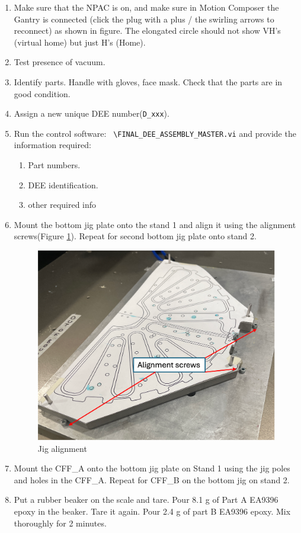 \documentclass[12pt]{cornelltfpxsop}
\begin{document}
\begin{paracol}{2}
\begin{enumerate}
\item Make sure that the NPAC is on, and make sure in Motion Composer the Gantry is connected (click the plug with a plus / the swirling arrows to reconnect) as shown in figure. The elongated circle should not show VH's (virtual home) but just H's (Home).
    \item Test presence of vacuum.        
    \item Identify parts. Handle with gloves, face mask. Check that the parts are in good condition.
    \item Assign a new unique DEE number(\texttt{D\_xxx}).
    \item Run the control software: \verb| \FINAL_DEE_ASSEMBLY_MASTER.vi| and provide the information required:
    \begin{enumerate}
        \item Part numbers.
        \item DEE identification.
        \item other required info
    \end{enumerate}
    \item Mount the bottom jig plate onto the stand 1 and align it using the alignment screws(Figure \ref{JigAlignment}). Repeat for second bottom jig plate onto stand 2.
    \begin{figure}
        \centering
        \includegraphics[width=0.8\linewidth]{img/jig_alignment.png}
        \caption{Jig alignment}
        \label{JigAlignment}
    \end{figure}
    \item Mount the CFF\_A onto the bottom jig plate on Stand 1 using the jig poles and holes in the CFF\_A. Repeat for CFF\_B on the bottom jig on stand 2.
    \item Put a rubber beaker on the scale and tare. Pour 8.1 g of Part A EA9396 epoxy in the beaker. Tare it again. Pour 2.4 g of part B EA9396 epoxy. Mix thoroughly for 2 minutes.   

\end{enumerate}
\end{paracol}
\end{document}
